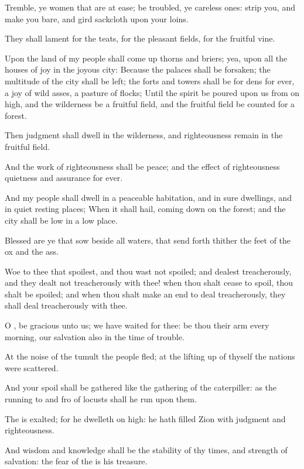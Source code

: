 \Verse Tremble, ye women that are at ease; be troubled, ye careless ones: strip you, and make you bare, and gird sackcloth upon your loins.

\Verse They shall lament for the teats, for the pleasant fields, for the fruitful vine.

\Verse Upon the land of my people shall come up thorns and briers; yea, upon all the houses of joy in the joyous city: \Verse Because the palaces shall be forsaken; the multitude of the city shall be left; the forts and towers shall be for dens for ever, a joy of wild asses, a pasture of flocks; \Verse Until the spirit be poured upon us from on high, and the wilderness be a fruitful field, and the fruitful field be counted for a forest.

\Verse Then judgment shall dwell in the wilderness, and righteousness remain in the fruitful field.

\Verse And the work of righteousness shall be peace; and the effect of righteousness quietness and assurance for ever.

\Verse And my people shall dwell in a peaceable habitation, and in sure dwellings, and in quiet resting places; \Verse When it shall hail, coming down on the forest; and the city shall be low in a low place.

\Verse Blessed are ye that sow beside all waters, that send forth thither the feet of the ox and the ass.


\Chapter
\Verse Woe to thee that spoilest, and thou wast not spoiled; and dealest treacherously, and they dealt not treacherously with thee! when thou shalt cease to spoil, thou shalt be spoiled; and when thou shalt make an end to deal treacherously, they shall deal treacherously with thee.

\Verse O \LORD, be gracious unto us; we have waited for thee: be thou their arm every morning, our salvation also in the time of trouble.

\Verse At the noise of the tumult the people fled; at the lifting up of thyself the nations were scattered.

\Verse And your spoil shall be gathered like the gathering of the caterpiller: as the running to and fro of locusts shall he run upon them.

\Verse The \LORD is exalted; for he dwelleth on high: he hath filled Zion with judgment and righteousness.

\Verse And wisdom and knowledge shall be the stability of thy times, and strength of salvation: the fear of the \LORD is his treasure.

